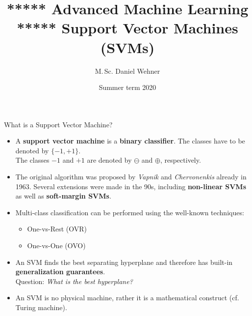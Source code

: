 




\title[Support Vector Machines (SVMs)]{***** Advanced Machine Learning ***** Support Vector Machines (SVMs)}
\author{M.\,Sc. Daniel Wehner}
\date{Summer term 2020}




\dwPrintTitle

\dwPrintToc


\begin{dwHeaderFrame}{What is a Support Vector Machine?}
	\begin{itemize}
		\item A \textbf{support vector machine} is a \textbf{binary classifier}. The classes have to be denoted by $\{-1, +1 \}$. \\
			The classes $-1$ and $+1$ are denoted by $\ominus$ and $\oplus$, respectively.
		\item The original algorithm was proposed by \textit{Vapnik} and \textit{Chervonenkis} already in 1963. 
			Several extensions were made in the 90s, including \textbf{non-linear SVMs} as well as \textbf{soft-margin SVMs}.
		\item Multi-class classification can be performed using the well-known techniques:
		\begin{itemize}
			\item One-vs-Rest (OVR)
			\item One-vs-One (OVO)
		\end{itemize}
		\item An SVM finds the best separating hyperplane and therefore has built-in \textbf{generalization guarantees}. \\
			Question: \textit{What is the best hyperplane?}
		\item An SVM is no physical machine, rather it is a mathematical construct (cf. Turing machine).
	\end{itemize}
\end{dwHeaderFrame}


